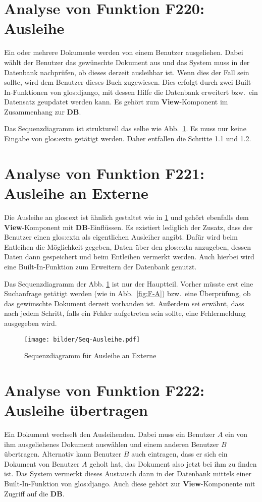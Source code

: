 \section{Analyse von Funktion F220: Ausleihe}
\label{f:220}
Ein oder mehrere Dokumente werden von einem Benutzer ausgeliehen. Dabei wählt 
der Benutzer das gewünschte Dokument aus und das System muss in der Datenbank 
nachprüfen, ob dieses derzeit ausleihbar ist. Wenn dies der Fall sein sollte, 
wird dem Benutzer dieses Buch zugewiesen. Dies erfolgt durch zwei 
Built-In-Funktionen von \gls{glos:django}, mit dessen Hilfe die Datenbank 
erweitert bzw.\ ein Datensatz geupdatet werden kann. Es gehört zum 
\textbf{View}-Komponent im Zusammenhang zur \textbf{DB}.

Das Sequenzdiagramm ist strukturell das selbe wie Abb.\ \ref{fig:221}. Es muss 
nur keine Eingabe von \gls{glos:ext}n getätigt werden. Daher entfallen die 
Schritte 1.1 und 1.2. 

\section{Analyse von Funktion F221: Ausleihe an Externe}
\label{f:221}
Die Ausleihe an \gls{glos:ext} ist ähnlich gestaltet wie in \ref{f:220} 
 und gehört ebenfalls dem \textbf{View}-Komponent mit 
\textbf{DB}-Einflüssen. Es existiert lediglich der Zusatz, dass der Benutzer 
einen \gls{glos:ext}n als eigentlichen Ausleiher angibt. Dafür wird beim 
Entleihen die Möglichkeit gegeben, Daten über den \gls{glos:ext}n anzugeben, 
dessen Daten dann gespeichert und beim Entleihen vermerkt werden. Auch hierbei 
wird eine Built-In-Funktion zum Erweitern der Datenbank genutzt.

Das Sequenzdiagramm der Abb. \ref{fig:221} ist nur der Hauptteil. Vorher müsste 
erst eine Suchanfrage getätigt werden (wie in Abb.\ \ref{fig:F-A}) bzw.\ eine 
Überprüfung, ob das gewünschte Dokument derzeit vorhanden ist. Außerdem sei 
erwähnt, dass nach jedem Schritt, falls ein Fehler aufgetreten sein sollte, eine 
Fehlermeldung ausgegeben wird.

\begin{figure}
\begin{center}
\texttt{[image: bilder/Seq-Ausleihe.pdf]}
\caption{Sequenzdiagramm für Ausleihe an Externe}
\label{fig:221}
\end{center}
\end{figure}

\section{Analyse von Funktion F222: Ausleihe übertragen}
\label{f:222}
Ein Dokument wechselt den Ausleihenden. Dabei muss ein Benutzer $A$ ein von ihm 
ausgeliehenes Dokument auswählen und einem anderen Benutzer $B$ übertragen. 
Alternativ kann Benutzer $B$ auch eintragen, dass er sich ein Dokument von 
Benutzer $A$ geholt hat, das Dokument also jetzt bei ihm zu finden ist. Das 
System vermerkt dieses Austausch dann in der Datenbank mittels einer 
Built-In-Funktion von \gls{glos:django}. Auch diese gehört zur 
\textbf{View}-Komponente mit Zugriff auf die \textbf{DB}.

